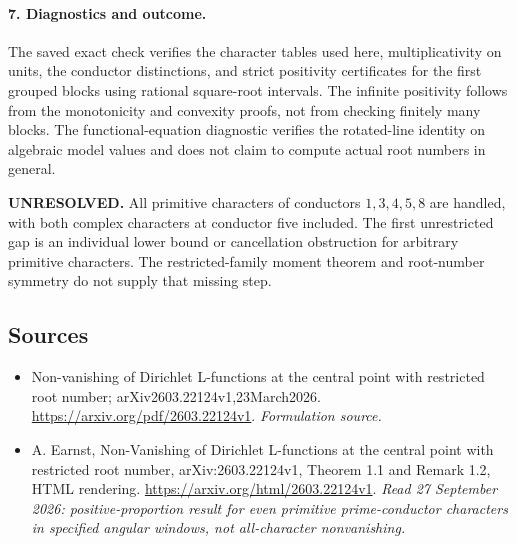 \documentclass[11pt]{article}
\begin{document}
\paragraph{7. Diagnostics and outcome.}
The saved exact check verifies the character tables used here, multiplicativity on units, the conductor distinctions, and strict positivity certificates for the first grouped blocks using rational square-root intervals. The infinite positivity follows from the monotonicity and convexity proofs, not from checking finitely many blocks. The functional-equation diagnostic verifies the rotated-line identity on algebraic model values and does not claim to compute actual root numbers in general.

\textbf{UNRESOLVED.} All primitive characters of conductors $1,3,4,5,8$ are handled, with both complex characters at conductor five included. The first unrestricted gap is an individual lower bound or cancellation obstruction for arbitrary primitive characters. The restricted-family moment theorem and root-number symmetry do not supply that missing step.

\subsection{Sources}
\begin{itemize}
\item[S1]Non-vanishing of Dirichlet L-functions at the central point with restricted root number; arXiv2603.22124v1,23March2026.
\url{https://arxiv.org/pdf/2603.22124v1}.
\textit{Formulation source.}
\item[E1]A. Earnst, Non-Vanishing of Dirichlet L-functions at the central point with restricted root number, arXiv:2603.22124v1, Theorem 1.1 and Remark 1.2, HTML rendering.
\url{https://arxiv.org/html/2603.22124v1}.
\textit{Read 27 September 2026: positive-proportion result for even primitive prime-conductor characters in specified angular windows, not all-character nonvanishing.}
\end{itemize}
\end{document}

